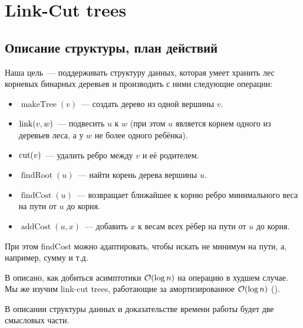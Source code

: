 \section{Link-Cut trees}

\subsection{Описание структуры, план действий} 

Наша цель~--- поддерживать структуру данных, которая умеет хранить лес корневых бинарных деревьев и производить с ними следующие операции:

\begin{itemize}
	\item $\operatorname{makeTree}(v)$~--- создать дерево из одной вершины $v$.
	\item $\operatorname{link}(v, w)$~--- подвесить $u$ к $w$ (при этом $u$ является корнем одного из деревьев леса, а у $w$ не более одного ребёнка).
	\item $\operatorname{cut}(v)$~--- удалить ребро между $v$ и её родителем.
	\item $\operatorname{findRoot}(u)$~--- найти корень дерева вершины $u$.
	\item $\operatorname{findCost}(u)$~--- возвращает ближайшее к корню ребро минимального веса на пути от $u$ до корня.
	\item $\operatorname{addCost}(u, x)$~--- добавить $x$ к весам всех рёбер на пути от $u$ до корня.
\end{itemize}

При этом findCost можно адаптировать, чтобы искать не минимум на пути, а, например, сумму и т.д.

В \cite{sleator1983linkcut} описано, как добиться асимптотики $\mathcal{O}(\log{n})$ на операцию в худшем случае. Мы же изучим link-cut trees, работающие за амортизированное $\mathcal{O}(\log{n})$ (\cite{tarjan1984linkcut}).

В описании структуры данных и доказательстве времени работы будет две смысловых части.

